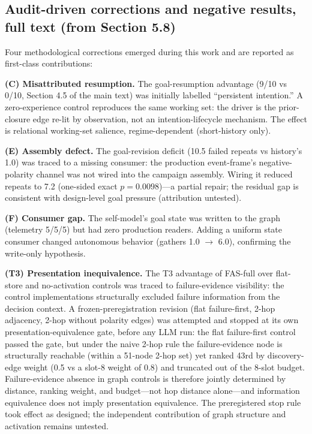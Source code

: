\documentclass[10pt]{article}
\begin{document}
\subsection{Audit-driven corrections and negative results, full text (from Section 5.8)}

Four methodological corrections emerged during this work and are
reported as first-class contributions:

\textbf{(C) Misattributed resumption.} The goal-resumption advantage
(9/10 vs 0/10, Section 4.5 of the main text) was initially labelled
``persistent intention.'' A zero-experience control reproduces the same
working set: the driver is the prior-closure edge re-lit by observation,
not an intention-lifecycle mechanism. The effect is relational
working-set salience, regime-dependent (short-history only).

\textbf{(E) Assembly defect.} The goal-revision deficit (10.5 failed
repeats vs history's 1.0) was traced to a missing consumer: the
production event-frame's negative-polarity channel was not wired into
the campaign assembly. Wiring it reduced repeats to 7.2
(one-sided exact $p{=}0.0098$)---a partial repair; the residual gap is consistent with design-level goal pressure (attribution untested).

\textbf{(F) Consumer gap.} The self-model's goal state was written to
the graph (telemetry 5/5/5) but had zero production readers. Adding a
uniform state consumer changed autonomous behavior (gathers 1.0
$\rightarrow$ 6.0), confirming the write-only hypothesis.

\textbf{(T3) Presentation inequivalence.} The T3 advantage of FAS-full
over flat-store and no-activation controls was traced to
failure-evidence visibility: the control implementations structurally
excluded failure information from the decision context. A
frozen-preregistration revision (flat failure-first, 2-hop adjacency,
2-hop without polarity edges) was attempted and stopped at its own
presentation-equivalence gate, before any LLM run: the flat
failure-first control passed the gate, but under the naive 2-hop rule
the failure-evidence node is structurally reachable (within a 51-node
2-hop set) yet ranked 43rd by discovery-edge weight (0.5 vs a slot-8
weight of 0.8) and truncated out of the 8-slot budget. Failure-evidence
absence in graph controls is therefore jointly determined by distance,
ranking weight, and budget---not hop distance alone---and information
equivalence does not imply presentation equivalence. The preregistered
stop rule took effect as designed; the independent contribution of
graph structure and activation remains untested.
\end{document}
